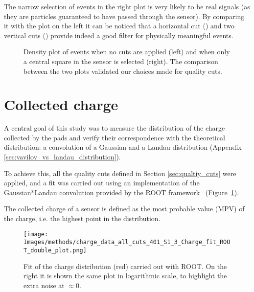 The narrow selection of events in the right plot is very likely to be real signals (as they are particles guaranteed to have passed through the sensor). By comparing it with the plot on the left it can be noticed that a horizontal cut () and two vertical cuts () provide indeed a good filter for physically meaningful events. 


\begin{figure}[h!tbp]
    \centering
    \hfill
    \centering
    \captionsetup{width=\captionwidth}
        \caption{Density plot of events when no cuts are applied (left) and when only a central square in the sensor is selected (right). The comparison between the two plots validated our choices made for quality cuts.}
\end{figure}


\section{Collected charge}\label{sec:methods_collected_charge}

A central goal of this study was to measure the distribution of the charge collected by the pads and verify their correspondence with the theoretical distribution: a convolution of a Gaussian and a Landau distribution (Appendix \ref{sec:vavilov_vs_landau_distribution}).

To achieve this, all the quality cuts defined in Section \ref{sec:qualtiy_cuts} were applied, and a fit was carried out using an implementation of the Gaussian*Landau convolution provided by the ROOT framework~\cite{Brun:1997pa} (Figure~\ref{fig:charge_ROOT_fit}).

The collected charge of a sensor is defined as the most probable value (MPV) of the charge, i.e. the highest point in the distribution.

\begin{figure}[h!tbp]
    \centering
    \texttt{[image: Images/methods/charge\_data\_all\_cuts\_401\_S1\_3\_Charge\_fit\_ROOT\_double\_plot.png]}
    \captionsetup{width=\captionwidth}
    \caption{Fit of the charge distribution (red) carried out with ROOT. On the right it is shown the same plot in logarithmic scale, to highlight the extra noise at \(\approx 0\).}
    \label{fig:charge_ROOT_fit}
\end{figure}

